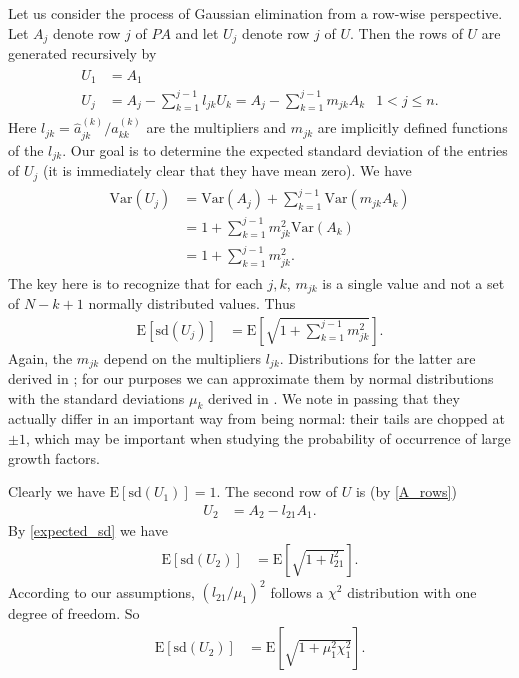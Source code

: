 \documentclass[12pt]{article}
\newcommand{\Var}{\mathrm{Var}}
\newcommand{\E}{\mathrm{E}}
\newcommand{\sd}{\mathrm{sd}}
\begin{document}
Let us consider the process of Gaussian 
elimination from a row-wise perspective.  
Let $A_j$ denote row $j$ of $PA$ and let $U_j$ denote row $j$ of $U$.  Then the rows
of $U$ are generated recursively by
\begin{align} \label{A_rows}
\begin{aligned}
U_1 & = A_1 \\
U_j & = A_j - \sum_{k=1}^{j-1} l_{jk} U_k  = A_j - \sum_{k=1}^{j-1} m_{jk} A_k & 1 < j \le n.
\end{aligned}
\end{align}
Here $l_{jk}=\hat{a}_{jk}^{(k)}/\hat{a}_{kk}^{(k)}$ are the multipliers and
$m_{jk}$ are implicitly defined functions
of the $l_{jk}$.  Our goal is to determine the
expected standard deviation of the entries of $U_j$ (it is immediately clear that they
have mean zero).  We have
\begin{align}
\begin{aligned}
\Var(U_j) & = \Var(A_j) + \sum_{k=1}^{j-1} \Var(m_{jk} A_k) \\
          & = 1+ \sum_{k=1}^{j-1} m_{jk}^2 \Var(A_k) \\
          & = 1 + \sum_{k=1}^{j-1} m_{jk}^2.
\end{aligned}
\end{align}
The key here is to recognize that for each $j,k$, $m_{jk}$ is
a single value and not a set of $N-k+1$ normally distributed values.
Thus
\begin{align} \label{expected_sd}
\E[\sd(U_j)] & = \E\left[\sqrt{1+\sum_{k=1}^{j-1} m_{jk}^2}\right].
\end{align}
Again, the $m_{jk}$ depend on the multipliers $l_{jk}$.  Distributions
for the latter are derived in \cite[Section 4]{trefethen1990}; for our
purposes we can approximate them by normal distributions with the
standard deviations $\mu_k$ derived in \cite{trefethen1990}.
We note in passing that they actually differ in an important way from being 
normal: their tails are chopped at $\pm 1$, which may be important
when studying the probability of occurrence of large growth factors.

Clearly we have $\E[\sd(U_1)]=1$.  The second row of $U$ is (by \eqref{A_rows})
\begin{align}
U_2 & = A_2 - l_{21} A_1.
\end{align}
By \eqref{expected_sd} we have
\begin{align}
\E[\sd(U_2)] & = \E[\sqrt{1+l_{21}^2}].
\end{align}
According to our assumptions, $(l_{21}/\mu_1)^2$ follows a $\chi^2$
distribution with one degree of freedom.  So
\begin{align}
\E[\sd(U_2)] & = \E\left[\sqrt{1+\mu_1^2\chi_1^2}\right].
\end{align}
\end{document}
